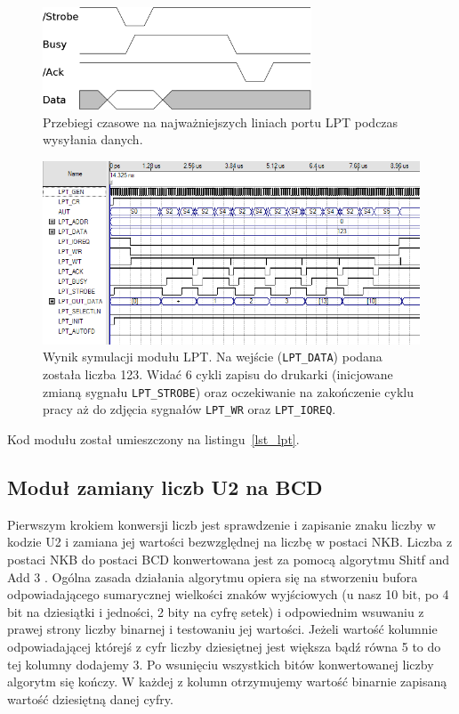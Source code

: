 \documentclass[a4paper,12pt]{report}
\begin{document}
\begin{figure}[h]
\centering
\includegraphics[width=8cm]{./pict/LPT.png}
\caption{Przebiegi czasowe na najważniejszych liniach portu LPT podczas wysyłania danych.}
\label{fig:lpt}
\end{figure}

\begin{figure}[h]
\centering
\includegraphics[width=16cm]{./pict/LPT_sim.png}
\caption{Wynik symulacji modułu LPT. Na wejście (\texttt{LPT\_DATA}) podana została liczba 123. Widać 6 cykli zapisu do drukarki (inicjowane zmianą sygnału \texttt{LPT\_STROBE}) oraz oczekiwanie na zakończenie cyklu pracy aż do zdjęcia sygnałów \texttt{LPT\_WR} oraz \texttt{LPT\_IOREQ}.}
\label{fig:lpt_sim}
\end{figure}

Kod modułu został umieszczony na listingu~\ref{lst_lpt}.

\subsection{Moduł zamiany liczb U2 na BCD}

Pierwszym krokiem konwersji liczb jest sprawdzenie i zapisanie znaku liczby w kodzie U2 i zamiana jej wartości bezwzględnej na liczbę w postaci NKB. Liczba z postaci NKB do postaci BCD konwertowana jest za pomocą algorytmu Shitf and Add 3 . Ogólna zasada działania algorytmu opiera się na stworzeniu bufora odpowiadającego sumarycznej wielkości znaków wyjściowych (u nasz 10 bit, po 4 bit na dziesiątki i jedności, 2 bity na cyfrę setek) i odpowiednim wsuwaniu z prawej strony liczby binarnej i testowaniu jej wartości. Jeżeli wartość kolumnie odpowiadającej którejś z cyfr liczby dziesiętnej jest większa bądź równa 5 to do tej kolumny dodajemy 3. Po wsunięciu wszystkich bitów konwertowanej liczby algorytm się kończy. W każdej z kolumn otrzymujemy wartość binarnie zapisaną wartość dziesiętną danej cyfry.
\end{document}
